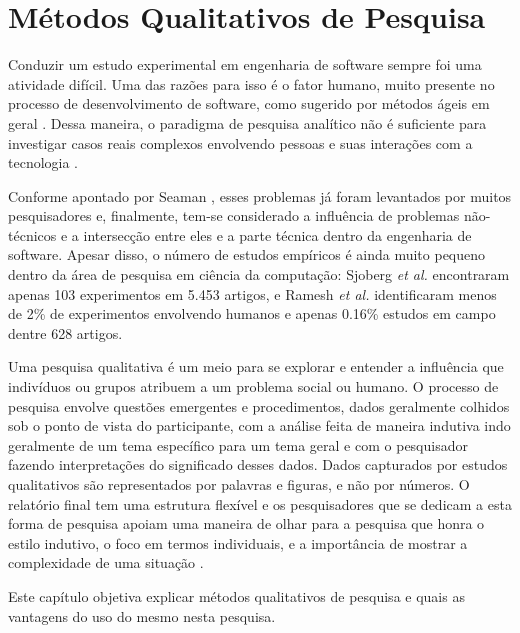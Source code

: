 \chapter{Métodos Qualitativos de Pesquisa} 
\label{cap:qualitativo}

Conduzir um estudo experimental em engenharia de software sempre foi uma
atividade difícil. Uma das razões para isso é o fator humano, muito presente 
no processo de desenvolvimento de software, como sugerido por métodos ágeis  em
geral \cite{AgileManifesto}. Dessa maneira, o paradigma de pesquisa analítico 
não é suficiente para investigar casos reais complexos envolvendo pessoas e 
suas interações com a tecnologia \cite{guidelines-case-study}.

Conforme apontado por Seaman \cite{seaman}, esses problemas já foram levantados
por muitos pesquisadores e, finalmente, tem-se considerado a influência de
problemas não-técnicos e a intersecção entre eles e a parte técnica
dentro da engenharia de software. 
Apesar disso, o número de estudos empíricos é ainda muito pequeno dentro da área
de pesquisa em ciência da computação: Sjoberg \textit{et al.} \cite{sjoberg} encontraram
apenas 103 experimentos em 5.453 artigos, e Ramesh \textit{et al.} \cite{ramesh}
identificaram menos de 2\% de experimentos envolvendo humanos e apenas 0.16\% 
estudos em campo dentre 628 artigos.

Uma pesquisa qualitativa é um meio para se explorar e entender a influência que 
indivíduos ou grupos atribuem a um problema social ou humano. O processo de
pesquisa envolve questões emergentes e procedimentos, dados geralmente colhidos
sob o ponto de vista do participante, com a análise feita de maneira indutiva
indo geralmente de um tema específico para um tema geral e com o pesquisador
fazendo interpretações do significado desses dados. Dados capturados por estudos
qualitativos são representados por palavras e figuras, e não por números.
O relatório final tem uma estrutura flexível e os pesquisadores que se
dedicam a esta forma de pesquisa apoiam uma maneira de olhar para a pesquisa que
honra o estilo indutivo, o foco em termos individuais, e a importância de mostrar a 
complexidade de uma situação \cite{creswell}. 

Este capítulo objetiva explicar métodos qualitativos de pesquisa e quais
as vantagens do uso do mesmo nesta pesquisa.

